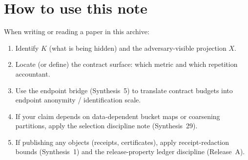 \documentclass[11pt]{article}
\begin{document}
\section{How to use this note}
When writing or reading a paper in this archive:
\begin{enumerate}[leftmargin=1.2em]
\item Identify $K$ (what is being hidden) and the adversary-visible projection $X$.
\item Locate (or define) the contract surface: which metric and which repetition accountant.
\item Use the endpoint bridge (Synthesis~5) to translate contract budgets into endpoint anonymity / identification scale.
\item If your claim depends on data-dependent bucket maps or coarsening partitions, apply the selection discipline note (Synthesis~29).\cite{series:selectiondiscipline}
\item If publishing any objects (receipts, certificates), apply receipt-redaction bounds (Synthesis~1) and the release-property ledger discipline (Release~A).\cite{series:receiptreduction,series:releaseproperty}
\end{enumerate}
\end{document}
